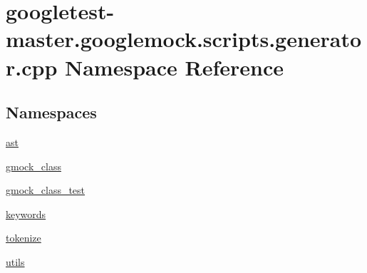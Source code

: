 \hypertarget{namespacegoogletest-master_1_1googlemock_1_1scripts_1_1generator_1_1cpp}{}\section{googletest-\/master.googlemock.\+scripts.\+generator.\+cpp Namespace Reference}
\label{namespacegoogletest-master_1_1googlemock_1_1scripts_1_1generator_1_1cpp}
\subsection*{Namespaces}
\begin{DoxyCompactItemize}
\item 
 \mbox{\hyperlink{namespacegoogletest-master_1_1googlemock_1_1scripts_1_1generator_1_1cpp_1_1ast}{ast}}
\item 
 \mbox{\hyperlink{namespacegoogletest-master_1_1googlemock_1_1scripts_1_1generator_1_1cpp_1_1gmock__class}{gmock\+\_\+class}}
\item 
 \mbox{\hyperlink{namespacegoogletest-master_1_1googlemock_1_1scripts_1_1generator_1_1cpp_1_1gmock__class__test}{gmock\+\_\+class\+\_\+test}}
\item 
 \mbox{\hyperlink{namespacegoogletest-master_1_1googlemock_1_1scripts_1_1generator_1_1cpp_1_1keywords}{keywords}}
\item 
 \mbox{\hyperlink{namespacegoogletest-master_1_1googlemock_1_1scripts_1_1generator_1_1cpp_1_1tokenize}{tokenize}}
\item 
 \mbox{\hyperlink{namespacegoogletest-master_1_1googlemock_1_1scripts_1_1generator_1_1cpp_1_1utils}{utils}}
\end{DoxyCompactItemize}
